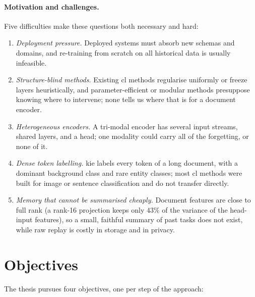 \paragraph{Motivation and challenges.} Five difficulties make these questions both necessary
and hard:
\begin{enumerate}
  \item \emph{Deployment pressure.} Deployed systems must absorb new schemas and domains, and
        re-training from scratch on all historical data is usually infeasible.
  \item \emph{Structure-blind methods.} Existing \gls{cl} methods regularise uniformly or freeze
        layers heuristically, and parameter-efficient or modular methods presuppose knowing
        where to intervene; none tells us where that is for a document encoder.
  \item \emph{Heterogeneous encoders.} A tri-modal encoder has several input streams, shared
        layers, and a head; one modality could carry all of the forgetting, or none of it.
  \item \emph{Dense token labelling.} \gls{kie} labels every token of a long document, with a
        dominant background class and rare entity classes; most \gls{cl} methods were built for
        image or sentence classification and do not transfer directly.
  \item \emph{Memory that cannot be summarised cheaply.} Document features are close to full
        rank (a rank-16 projection keeps only $43\%$ of the variance of the head-input
        features), so a small, faithful summary of past tasks does not exist, while raw replay
        is costly in storage and in privacy.
\end{enumerate}

\section{Objectives}
\label{sec:intro-objectives}

The thesis pursues four objectives, one per step of the approach:

